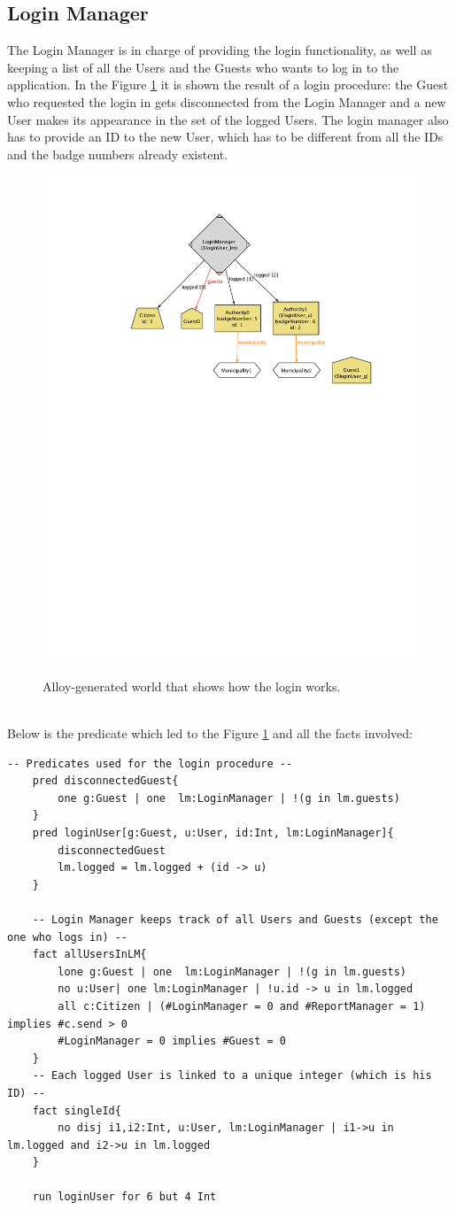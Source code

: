 \documentclass{report}
\begin{document}
\subsection{Login Manager}
The Login Manager is in charge of providing the login functionality, as well as keeping a list of all the Users and the Guests who wants to log in to the application. In the Figure \ref{fig:allogin} it is shown the result of a login procedure: the Guest who requested the login in gets disconnected from the Login Manager and a new User makes its appearance in the set of the logged Users. The login manager also has to provide an ID to the new User, which has to be different from all the IDs and the badge numbers already existent.
\begin{figure}[ht!]
	\begin{center}
	\includegraphics[width=.7\textwidth]{./img/Login.pdf}
	\label{fig:allogin}
	\caption{Alloy-generated world that shows how the login works.}
	\end{center}
\end{figure}\\
Below is the predicate which led to the Figure \ref{fig:allogin} and all the facts involved:
\begin{lstlisting}[language=alloy]
	-- Predicates used for the login procedure --
	pred disconnectedGuest{
		one g:Guest | one  lm:LoginManager | !(g in lm.guests)
	}
	pred loginUser[g:Guest, u:User, id:Int, lm:LoginManager]{
		disconnectedGuest
		lm.logged = lm.logged + (id -> u) 
	}

	-- Login Manager keeps track of all Users and Guests (except the one who logs in) --
	fact allUsersInLM{
		lone g:Guest | one  lm:LoginManager | !(g in lm.guests)
		no u:User| one lm:LoginManager | !u.id -> u in lm.logged
		all c:Citizen | (#LoginManager = 0 and #ReportManager = 1) implies #c.send > 0
		#LoginManager = 0 implies #Guest = 0
	}	
	-- Each logged User is linked to a unique integer (which is his ID) --
	fact singleId{
		no disj i1,i2:Int, u:User, lm:LoginManager | i1->u in lm.logged and i2->u in lm.logged 
	}

	run loginUser for 6 but 4 Int
\end{lstlisting}
\end{document}
